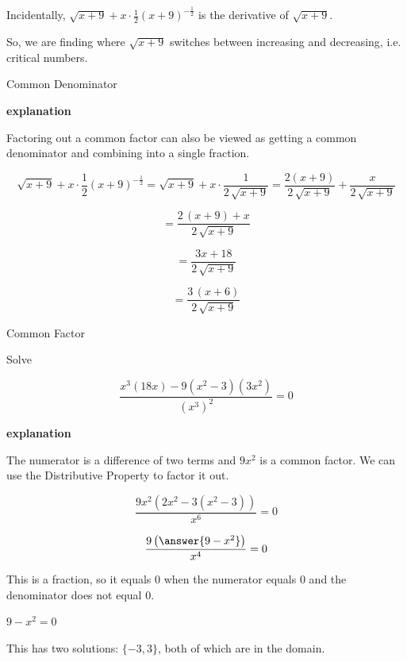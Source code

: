 \documentclass{ximera}
\begin{document}
Incidentally, $\sqrt{x+9} + x \cdot \frac{1}{2} (x+9)^{-\tfrac{1}{2}}$ is the derivative of $\sqrt{x+9}$.  

So, we are finding where $\sqrt{x+9}$ switches between increasing and decreasing, i.e. critical numbers.






\begin{example}  Common Denominator

\textbf{\textcolor{red!75!green}{explanation}} 


Factoring out a common factor can also be viewed as getting a common denominator and combining into a single fraction. 


\[
\sqrt{x+9} + x \cdot \frac{1}{2} (x+9)^{-\tfrac{1}{2}} = \sqrt{x+9} + x \cdot \frac{1}{2 \, \sqrt{x+9}} = \frac{2(x+9)}{2 \, \sqrt{x+9}} +  \frac{x}{2 \, \sqrt{x+9}}   
\]


\[
= \frac{2 \, (x + 9) + x}{2 \, \sqrt{x+9}}   
\]


\[
= \frac{3x + 18}{2 \, \sqrt{x+9}}   
\]


\[
= \frac{3 \, (x + 6)}{2 \, \sqrt{x+9}}   
\]


\end{example}









\begin{example}  Common Factor


Solve 

\[  \frac{x^3 (18x) - 9(x^2-3)(3x^2)}{(x^3)^2} = 0 \]



\textbf{\textcolor{red!75!green}{explanation}} 


The numerator is a difference of two terms and $9 x^2$ is a common factor.  We can use the Distributive Property to factor it out.



\[  \frac{9x^2 (2x^2 - 3(x^2-3))}{x^6} = 0  \]


\[  \frac{9 \left( \answer{9 - x^2} \right)}{x^4} = 0 \]



This is a fraction, so it equals $0$ when the numerator equals $0$ and the denominator does not equal $0$.


$9 - x^2 = 0$

This has two solutions: $\{ -3, 3  \}$, both of which are in the domain.








\end{example}
\end{document}
